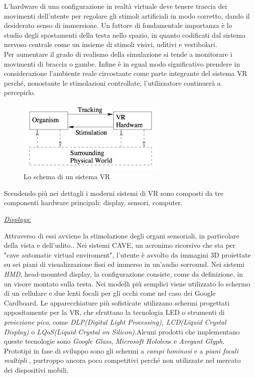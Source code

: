 \newpage

L'hardware di una configurazione in realtà virtuale deve tenere traccia dei movimenti dell'utente per regolare gli stimoli artificiali in modo corretto, dando il desiderato senso di immersione.
Un fattore di fondamentale importanza è lo studio degli spostamenti della testa nello spazio, in quanto codificati dal sistema nervoso centrale come un insieme di stimoli visivi, uditivi e vestibolari. \\
Per aumentare il grado di realismo della simulazione si tende a monitorare i movimenti di braccia o gambe. Infine è in egual modo significativo prendere in considerazione l'ambiente reale circostante come parte integrante del sistema VR perché, nonostante  le stimolazioni controllate, l'utilizzatore  continuerà a percepirlo.
\begin{figure}[H]
	\includegraphics[width=0.65\textwidth]{figure/TrackingStimuliBB}
	\centering
	\caption{Lo schema di un sistema VR}
\end{figure}

\newpage

Scendendo più nei dettagli i moderni sistemi di VR sono composti da tre componenti hardware principali: display, sensori, computer.
\begin{flushleft}
	\underline{\textit{Displays}:}
\end{flushleft}  Attraverso di essi avviene la stimolazione degli organi sensoriali, in particolare della vista e dell'udito.. Nei sistemi {CAVE}, un acronimo ricorsivo che sta per "cave automatic virtual enviroment", l'utente è avvolto da immagini 3D proiettate su sei piani di visualizzazione fissi ed immerso in un'audio sorround. Nei sistemi \textit{HMD}, head-mounted display, la configurazione consiste, come da definizione, in un visore montato sulla testa. Nei modelli più semplici viene utilizzato lo schermo di un cellulare e due lenti focali per gli occhi come nel caso dei Google Cardboard. Le apparecchiature più sofisticate utilizzano schermi progettati appositamente per la VR, che sfruttano la tecnologia LED 
o strumenti di \textit{proiezione pico}, come \textit{DLP(Digital Light Processing), LCD(Liquid Crystal Display)} o \textit{LQoS(Liquid Crystal on Silicon)}.Alcuni prodotti che implementano queste tecnologie sono \textit{ Google Glass}, \textit{Microsoft Hololen}s e \textit{Avegant Glyph}. Prototipi in fase di sviluppo sono gli schermi a \textit{campi luminosi} \cite{LFD} e a \textit{piani focali multipli} \cite{MFP}, purtroppo ancora poco competitivi perché non utilizzate nel mercato dei dispositivi mobili. 

